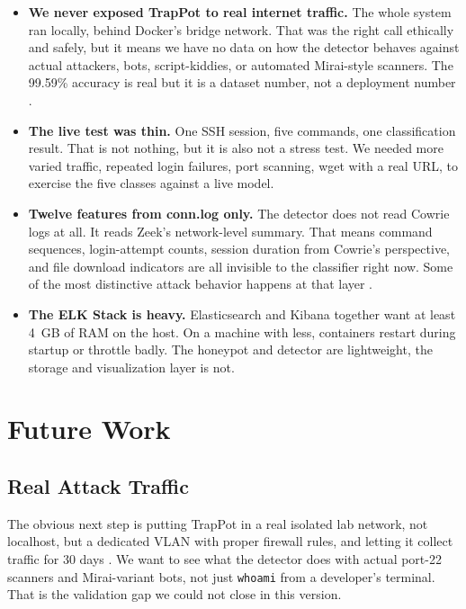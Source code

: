 \begin{itemize}

\item \textbf{We never exposed TrapPot to real internet traffic.} The whole system ran locally, behind Docker's bridge network. That was the right call ethically and safely, but it means we have no data on how the detector behaves against actual attackers, bots, script-kiddies, or automated Mirai-style scanners. The 99.59\% accuracy is real but it is a dataset number, not a deployment number \cite{iot23dataset,famera2025mirai}.

\item \textbf{The live test was thin.} One SSH session, five commands, one classification result. That is not nothing, but it is also not a stress test. We needed more varied traffic, repeated login failures, port scanning, wget with a real URL, to exercise the five classes against a live model.

\item \textbf{Twelve features from conn.log only.} The detector does not read Cowrie logs at all. It reads Zeek's network-level summary. That means command sequences, login-attempt counts, session duration from Cowrie's perspective, and file download indicators are all invisible to the classifier right now. Some of the most distinctive attack behavior happens at that layer \cite{9071014,rodriguezgomez2025systematic}.

\item \textbf{The ELK Stack is heavy.} Elasticsearch and Kibana together want at least 4~GB of RAM on the host. On a machine with less, containers restart during startup or throttle badly. The honeypot and detector are lightweight, the storage and visualization layer is not.

\end{itemize}

\section{Future Work}
\label{sec:future_work}

\subsection{Real Attack Traffic}
\label{subsec:realistic_attack_traffic}

The obvious next step is putting TrapPot in a real isolated lab network, not localhost, but a dedicated VLAN with proper firewall rules, and letting it collect traffic for 30 days \cite{lee2021classification,suareztangil2023stories}. We want to see what the detector does with actual port-22 scanners and Mirai-variant bots, not just \texttt{whoami} from a developer's terminal. That is the validation gap we could not close in this version.

